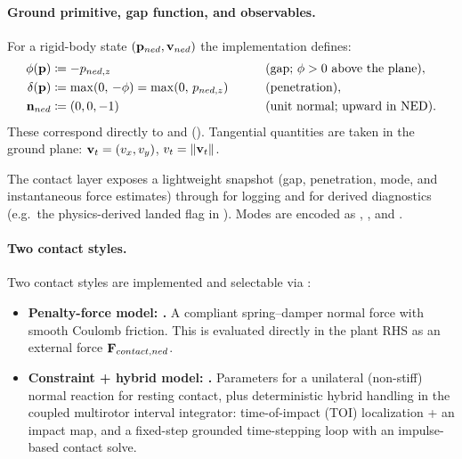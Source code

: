 \paragraph{Ground primitive, gap function, and observables.}
For a rigid-body state \((\mathbf{p}_{ned}, \mathbf{v}_{ned})\) the implementation defines:
\begin{align}
  \phi(\mathbf{p}) &\coloneqq -p_{ned,z}\qquad &&\text{(gap; \(\phi>0\) above the plane)},\\
  \delta(\mathbf{p}) &\coloneqq \max(0,\,-\phi)=\max(0,\,p_{ned,z})\qquad &&\text{(penetration)},\\
  \mathbf{n}_{ned} &\coloneqq (0,0,-1)\qquad &&\text{(unit normal; upward in NED)}.
\end{align}
These correspond directly to  and  (). Tangential quantities are taken in the ground plane: \(\mathbf{v}_{t}=(v_x,v_y)\), \(v_{t}=\|\mathbf{v}_{t}\|\).

The contact layer exposes a lightweight  snapshot (gap, penetration, mode, and instantaneous force estimates) through  for logging and for derived diagnostics (e.g.\ the physics-derived landed flag in ). Modes are encoded as , , and .

\paragraph{Two contact styles.}
Two contact styles are implemented and selectable via :

\begin{itemize}[leftmargin=*,itemsep=2pt]
  \item \textbf{Penalty-force model: .} A compliant spring--damper normal force with smooth Coulomb friction. This is evaluated directly in the plant RHS as an external force \(\mathbf{F}_{contact,ned}\).
  \item \textbf{Constraint + hybrid model: .} Parameters for a unilateral (non-stiff) normal reaction for resting contact, plus deterministic hybrid handling in the coupled multirotor interval integrator: time-of-impact (TOI) localization + an impact map, and a fixed-step grounded time-stepping loop with an impulse-based contact solve.
\end{itemize}

